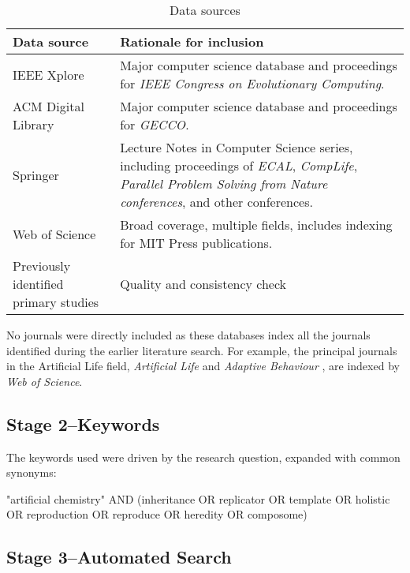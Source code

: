 \begin{table}
\footnotesize
\begin{center}
\begin{tabular}{@{}p{4cm}p{9cm}@{}}
\toprule
Data source & Rationale for inclusion\\
\midrule
IEEE Xplore & Major computer science database and proceedings for \textit{IEEE Congress on Evolutionary Computing}.\\
ACM Digital Library & Major computer science database and proceedings for \textit{GECCO}.\\
Springer & Lecture Notes in Computer Science series, including proceedings of \textit{ECAL}, \textit{CompLife}, \textit{Parallel Problem Solving from Nature conferences}, and other conferences.\\
Web of Science & Broad coverage, multiple fields, includes indexing for MIT Press publications.\\
Previously identified primary studies & Quality and consistency check\\
\bottomrule
\end{tabular}
\end{center}
\caption{Data sources}
\end{table}

No journals were directly included as these databases index all the journals identified during the earlier literature search. For example, the principal journals in the Artificial Life field, \emph{Artificial Life} and \emph{Adaptive Behaviour} \parencite{Aicardi2010}, are indexed by \textit{Web of Science}.

\subsection{Stage 2--Keywords}

The keywords used were driven by the research question, expanded with common synonyms:

"artificial chemistry" AND (inheritance OR replicator OR template OR holistic OR reproduction OR reproduce OR heredity OR composome)

\subsection{Stage 3--Automated Search}

